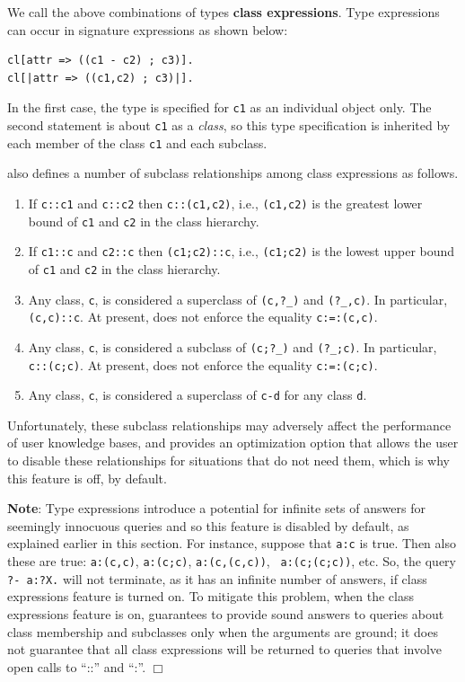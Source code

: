 \documentclass[11pt]{article}
\newcommand{\ERGO}{\mbox{\smaller{\ensuremath{\cal{E}}\smaller{{\sc{RGO}}}}}\xspace}
\newcommand{\FLSYSTEM}{\ERGO}
\begin{document}
We call the above combinations of types {\bf class expressions}.  
Type expressions can occur in signature expressions as shown below:
\begin{verbatim}
cl[attr => ((c1 - c2) ; c3)].
cl[|attr => ((c1,c2) ; c3)|].
\end{verbatim}
In the first case, the type is specified for \texttt{c1} as an individual
object only.
The second statement is about \texttt{c1} as a \emph{class}, so this type
specification is inherited by each member of the class \texttt{c1} and each
subclass.   

\FLSYSTEM also defines a number of subclass relationships among class
expressions as follows.
\begin{enumerate}
\item If {\tt c::c1} and {\tt c::c2} then {\tt c::(c1,c2)}, i.e.,
  {\tt (c1,c2)} is the greatest lower bound of {\tt c1} and {\tt c2} in the
  class hierarchy.
\item If {\tt c1::c} and {\tt c2::c} then {\tt (c1;c2)::c}, i.e.,
  {\tt (c1;c2)} is the lowest upper bound of {\tt c1} and {\tt c2} in the
  class hierarchy. 
\item Any class, {\tt c}, is considered a superclass of {\tt (c,?\_)} and
  {\tt (?\_,c)}. In particular, {\tt (c,c)::c}. At present, \FLSYSTEM does not
  enforce the equality {\tt c:=:(c,c)}.      
\item Any class, {\tt c}, is considered a subclass of {\tt (c;?\_)} and
  {\tt (?\_;c)}. In particular, {\tt c::(c;c)}. At present, \FLSYSTEM does not
  enforce the equality {\tt c:=:(c;c)}.      
\item Any class, {\tt c}, is considered a superclass of {\tt c-d} for any
  class {\tt d}.   
\end{enumerate}
Unfortunately, these subclass relationships may adversely affect the
performance of user knowledge bases, and \FLSYSTEM provides an optimization
option that allows the user to disable these relationships for situations
that do not need them, which is why this feature is off, by default.

\noindent
{\bf Note}: Type expressions introduce a potential for infinite sets of answers
for seemingly innocuous queries and so this feature is disabled by default,
as explained earlier in this section. For instance, suppose that {\tt a:c} is
true. Then also these are true: {\tt a:(c,c)}, {\tt a:(c;c)}, {\tt a:(c,(c,c))}, {\tt
  a:(c;(c;c))}, etc. So, the query {\tt ?- a:?X.} will not terminate, as it
has an infinite number of answers, if class expressions feature is turned
on.
To mitigate this problem, when the class expressions feature is on,
\FLSYSTEM guarantees to provide sound answers to queries about class
membership and subclasses only when the arguments are ground; it does
not guarantee that all class expressions will be returned to 
queries that involve open calls to ``::'' and ``:''.
\hfill$\Box$
\end{document}
